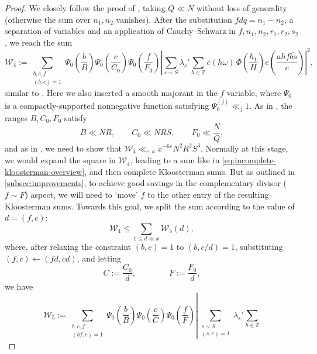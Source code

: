 \documentclass[reqno,11pt]{amsart}
\theoremstyle{remark}
\numberwithin{equation}{section}
\newcommand{\Z}{\mathbb{Z}}
\newcommand{\msW}{\mathscr{W}}
\newcommand{\eps}{\varepsilon}
\renewcommand{\bar}{\overline}
\begin{document}
\begin{proof}
We closely follow the proof of \cite[Lemma 7.1]{maynard2025primes2}, taking $Q \ll N$ without loss of generality (otherwise the sum over $n_1, n_2$ vanishes). 
After the substitution $f d q = n_1 - n_2$, a separation of variables and an application of Cauchy--Schwarz in $f, n_1, n_2, r_1, r_2, s_2$, we reach the sum
\[
    \msW_4 :=
    \sum_{\substack{b, c, f \\ (b, c) = 1}} \Psi_0\left(\frac{b}{B}\right) \Psi_0\left(\frac{c}{C_0}\right)
    \Psi_0\left(\frac{f}{F_0}\right)
    \left\vert 
    \sum_{s \sim S} \lambda_s' \sum_{h \in \Z}
    e(h\omega)\, \Phi\left(\frac{h_1}{H}\right)
    e\left(\frac{ahf\bar{bs}}{c}\right)
    \right\vert^2,
\]
similar to \cite[p.\,23, third display]{maynard2025primes2}.
Here we also inserted a smooth majorant in the $f$ variable, where $\Psi_0$ is a compactly-supported nonnegative function satisfying $\Psi_0^{(j)} \ll_j 1$. As in \cite[p.\,23, second display]{maynard2025primes2}, the ranges $B, C_0, F_0$ satisfy
\begin{equation} \label{eq:bcf-bounds}
    B \ll NR, \qquad C_0 \ll NRS, \qquad F_0 \ll \frac{N}{Q},
\end{equation}
and as in \cite[(7.4)]{maynard2025primes2}, we need to show that $\msW_4 \ll_{\eps,a} x^{-6\eps} N^2 R^2 S^3$. Normally at this stage, we would expand the square in $\msW_4$, leading to a sum like in \cref{eq:incomplete-kloosterman-overview}, and then complete Kloosterman sums. But as outlined in \cref{subsec:improvements}, to achieve good savings in the complementary divisor ($f \sim F$) aspect, we will need to `move' $f$ to the other entry of the resulting Kloosterman sums. Towards this goal, we split the sum according to the value of $d = (f, c)$:
\begin{equation} \label{eq:W4-split}
    \msW_4 \le \sum_{1 \le d \ll x} \msW_5(d),
\end{equation}
where, after relaxing the constraint $(b, c) = 1$ to $(b, c/d) = 1$, substituting $(f, c) \gets (fd, cd)$, and letting
\begin{equation} \label{eq:cf-substitution}
    C := \frac{C_0}{d},
    \qquad\qquad 
    F := \frac{F_0}{d},
\end{equation}
we have
\[
    \msW_5 := \sum_{\substack{b, c, f \\ (bf, c) = 1}} \Psi_0\left(\frac{b}{B}\right) \Psi_0\left(\frac{c}{C}\right)
    \Psi_0\left(\frac{f}{F}\right)
    \left\vert 
    \sum_{\substack{s \sim S \\ (s, c) = 1}} \lambda_s' \sum_{h \in \Z}
\]
\end{proof}
\end{document}
